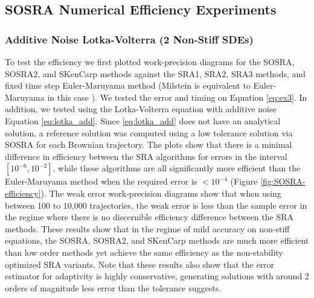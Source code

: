 \documentclass{article}
\begin{document}
\subsection{SOSRA Numerical Efficiency Experiments}

\subsubsection{Additive Noise Lotka-Volterra (2 Non-Stiff SDEs)}

To test the efficiency we first plotted work-precision \cite{RN3353,RN3807,RN3790}
diagrams for the SOSRA, SOSRA2, and SKenCarp methods against the SRA1,
SRA2, SRA3 \cite{RN2707} methods, and fixed time step Euler-Maruyama
method (Milstein is equivalent to Euler-Maruyama in this case \cite{RN3169}).
We tested the error and timing on Equation \ref{eq:ex3}. In addition,
we tested using the Lotka-Volterra equation with additive noise Equation
\ref{eq:lotka_add}. Since \ref{eq:lotka_add} does not have an analytical
solution, a reference solution was computed using a low tolerance
solution via SOSRA for each Brownian trajectory. The plots show that
there is a minimal difference in efficiency between the SRA algorithms
for errors in the interval $\left[10^{-6},10^{-2}\right]$, while
these algorithms are all significantly more efficient than the Euler-Maruyama
method when the required error is $<10^{-4}$ (Figure \ref{fig:SOSRA-efficiency}).
The weak error work-precision diagrams show that when using between
100 to 10,000 trajectories, the weak error is less than the sample
error in the regime where there is no discernible efficiency difference
between the SRA methods. These results show that in the regime of
mild accuracy on non-stiff equations, the SOSRA, SOSRA2, and SKenCarp
methods are much more efficient than low order methods yet achieve
the same efficiency as the non-stability optimized SRA variants. Note
that these results also show that the error estimator for adaptivity
is highly conservative, generating solutions with around 2 orders
of magnitude less error than the tolerance suggests.
\end{document}
